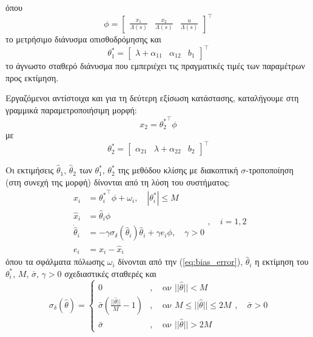 \documentclass[a4paper,12pt]{article}
\begin{document}
όπου
\begin{equation}
    \phi = 
    \begin{bmatrix}
        \frac{x_1}{\Lambda(s)} & \frac{x_2}{\Lambda(s)} & \frac{u}{\Lambda(s)}
    \end{bmatrix}^{\top}
    \label{eq:regresson_vector}
\end{equation}
το μετρήσιμο διάνυσμα οπισθοδρόμησης και
\begin{equation}
    \theta_1^* = 
    \begin{bmatrix}
        \lambda + \alpha_{11} & \alpha_{12} & b_1
    \end{bmatrix}^{\top}
    \label{eq:theta_star_1}
\end{equation}
το άγνωστο σταθερό διάνυσμα που εμπεριέχει τις πραγματικές τιμές των παραμέτρων προς εκτίμηση.

Εργαζόμενοι αντίστοιχα και για τη δεύτερη εξίσωση κατάστασης, καταλήγουμε στη γραμμικά 
παραμετροποιήσιμη μορφή:
\[
    x_2 = {\theta_2^*}^{\top} \phi
\]
με
\begin{equation}
    \theta_2^* = 
    \begin{bmatrix}
        \alpha_{21} & \lambda + \alpha_{22} & b_2
    \end{bmatrix}^{\top}
    \label{eq:theta_star_2}
\end{equation}

Οι εκτιμήσεις $\hat{\theta}_1, \, \hat{\theta}_2$ των $\theta_1^*, \, \theta_2^*$ της μεθόδου κλίσης με
διακοπτική $\sigma$-τροποποίηση (στη συνεχή της μορφή) δίνονται από τη λύση του συστήματος:
\begin{equation}
    \begin{aligned}
    x_i &= {\theta_i^*}^{\top} \phi + \omega_i, \quad |\theta_i^*| \leq M \\
    \hat{x}_i &= \hat{\theta}_i \phi \\
    \dot{\hat{\theta}}_i &= - \gamma \sigma_{\delta}(\hat{\theta}_i) \hat{\theta}_i + 
    \gamma e_i \phi, \quad \gamma > 0 \\
    e_i &= x_i - \hat{x}_i
    \end{aligned}, \quad i = 1, 2
    \label{eq:gradient_switching_sigma_modification}
\end{equation}
όπου τα σφάλματα πόλωσης $\omega_i$ δίνονται από την (\ref{eq:bias_error}), $\hat{\theta}_i$ η εκτίμηση
του $\theta_i^*$, $M, \, \bar{\sigma}, \, \gamma > 0$ σχεδιαστικές σταθερές και
\begin{equation*}
    \sigma_{\delta}(\hat{\theta}) = 
    \left\{
    \begin{aligned}
        0&, \quad \texttt{αν } ||\hat{\theta}|| < M \\
        \bar{\sigma}\left(\frac{||\hat{\theta}||}{M} - 1\right)&, 
        \quad \texttt{αν } M \leq ||\hat{\theta}|| \leq 2M \\
        \bar{\sigma}&, \quad \texttt{αν } ||\hat{\theta}|| > 2M
    \end{aligned}, \quad \bar{\sigma} > 0
    \right.
\end{equation*}
\end{document}
